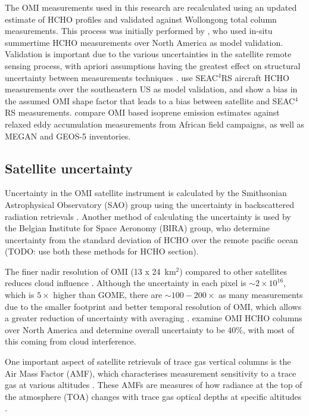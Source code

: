     The OMI measurements used in this research are recalculated using an updated estimate of HCHO profiles and validated against Wollongong total column measurements. 
    This process was initially performed by \cite{Palmer2003}, who used in-situ summertime HCHO measurements over North America as model validation.
    Validation is important due to the various uncertainties in the satellite remote sensing process, with apriori assumptions having the greatest effect on structural uncertainty between measurements techniques \citet{Lorente2017}.
    \cite{Zhu2016} use SEAC$^4$RS aircraft HCHO measurements over the southeastern US as model validation, and show a bias in the assumed OMI shape factor that leads to a bias between satellite and SEAC$^4$RS measurements.
    \cite{Marais2014} compare OMI based isoprene emission estimates against relaxed eddy accumulation measurements from African field campaigns, as well as MEGAN and GEOS-5 inventories.
    
  \subsection{Satellite uncertainty}
    Uncertainty in the OMI satellite instrument is calculated by the Smithsonian Astrophysical Observatory (SAO) group using the uncertainty in backscattered radiation retrievals \citep{Abad2015, Abad2016}.
    Another method of calculating the uncertainty is used by the Belgian Institute for Space Aeronomy (BIRA) group, who determine uncertainty from the standard deviation of HCHO over the remote pacific ocean (TODO: use both these methods for HCHO section)\citep{DeSmedt2012, DeSmedt2015}.
    
    The finer nadir resolution of OMI (13 x 24~km${^2}$) compared to other satellites reduces cloud influence \citep{Millet2006,Millet2008}. 
    Although the uncertainty in each pixel is $\sim 2 \times 10^{16}$, which is $5 \times$ higher than GOME, there are $\sim 100-200 \times $ as many measurements due to the smaller footprint and better temporal resolution of OMI, which allows a greater reduction of uncertainty with averaging \citep{Chance2002,Millet2008}.
    \cite{Millet2006} examine OMI HCHO columns over North America and determine overall uncertainty to be 40\%, with most of this coming from cloud interference.
    
    One important aspect of satellite retrievals of trace gas vertical columns is the Air Mass Factor (AMF), which characterises measurement sensitivity to a trace gas at various altitudes \cite[e.g.]{Palmer2001}.
    These AMFs are measures of how radiance at the top of the atmosphere (TOA) changes with trace gas optical depths at specific altitudes \citep{Lorente2017}.
    

